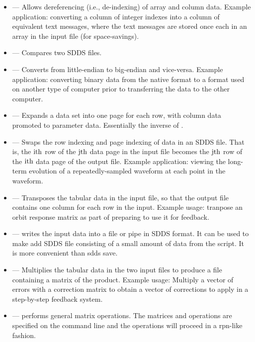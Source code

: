 \documentclass[11pt]{article}
\begin{document}
\begin{itemize}
\item {} --- Allows dereferencing (i.e., de-indexing) of array and column data.  Example
application: converting a column of integer indexes into a column of equivalent text messages, where the text
messages are stored once each in an array in the input file (for space-savings).
\item {} --- Compares two SDDS files.

\item {} --- Converts from little-endian to
big-endian and vice-versa.  Example application: converting binary
data from the native format to a format used on another type of
computer prior to transferring the data to the other computer.

\item {} --- Expands a data set into one page for each row, with column data promoted
to parameter data.  Essentially the inverse of . 

\item {} --- Swaps the row indexing and page
indexing of data in an SDDS file. That is, the ${\rm i {th}}$ row of
the ${\rm j {th}}$ data page in the input file becomes the ${\rm
j{th}}$ row of the ${\rm i {th}}$ data page of the output file.
Example application: viewing the long-term evolution of a
repeatedly-sampled waveform at each point in the waveform.

\item {} --- Transposes the tabular data in the
input file, so that the output file contains one column for each row
in the input.  Example usage: tranpose an orbit response matrix as
part of preparing to use it for feedback.

\item {} --- writes the input data into a file or 
pipe in SDDS format. It can be used to make add SDDS file consisting of
a small amount of data from the script. It is more convenient than {sdds save}.

\item {} --- Multiplies the tabular data in the
two input files to produce a file containing a matrix of the product.
Example usage: Multiply a vector of errors with a correction matrix to
obtain a vector of corrections to apply in a step-by-step feedback
system.

\item {} --- performs general matrix operations. 
The matrices and operations are specified on the command line and 
the operations will proceed in a rpn-like fashion.


\end{itemize}
\end{document}
